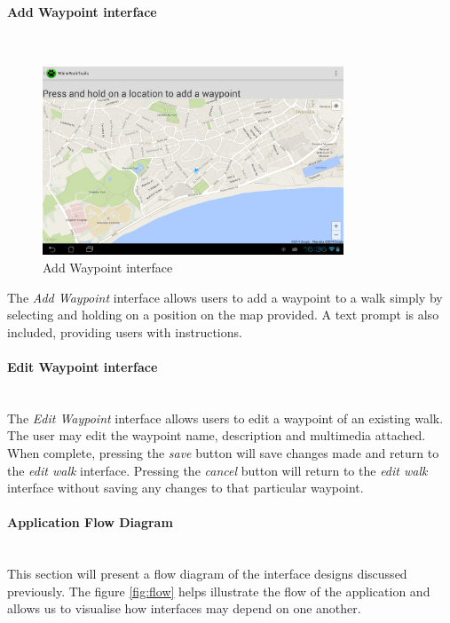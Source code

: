 \documentclass[11pt,a4paper]{report}
\begin{document}
\paragraph{Add Waypoint interface}\mbox{}\\
\begin{figure}[H]
    \centering
    \includegraphics[width=0.8\textwidth]{chris/add_waypoint}
    \caption{Add Waypoint interface}
    \label{fig:edit_waypoint}
\end{figure}

The \emph{Add Waypoint} interface allows users to add a waypoint to a walk simply by selecting and holding on a position on the map provided. A text prompt is also included, providing users with instructions.

\paragraph{Edit Waypoint interface}\mbox{}\\


The \emph{Edit Waypoint} interface allows users to edit a waypoint of an existing walk. The user may edit the waypoint name, description and multimedia attached. When complete, pressing the \emph{save} button will save changes made and return to the \emph{edit walk} interface. Pressing the \emph{cancel} button will return to the \emph{edit walk} interface without saving any changes to that particular waypoint.

\paragraph*{Application Flow Diagram}\mbox{}\\

This section will present a flow diagram of the interface designs discussed previously. The figure \ref{fig:flow} helps illustrate the flow of the application and allows us to visualise how interfaces may depend on one another.
\end{document}

